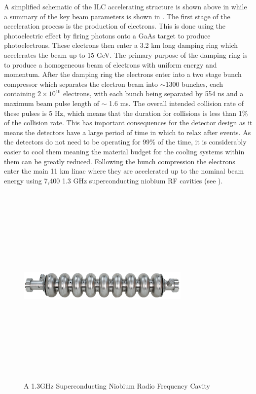A simplified schematic of the \ac{ILC} accelerating structure is shown above in  while a summary of the key beam parameters is shown in . The first stage of the acceleration process is the production of electrons. This is done using the photoelectric effect by firing photons onto a GaAs target to produce photoelectrons. These electrons then enter a 3.2 km long damping ring which accelerates the beam up to 15 GeV. The primary purpose of the damping ring is to produce a homogeneous beam of electrons with uniform energy and momentum. After the damping ring the electrons enter into a two stage bunch compressor which separates the electron beam into ${\sim}$1300 bunches, each containing ${2\times10^{10}}$ electrons, with each bunch being separated by 554 ns and a maximum beam pulse length of $\sim$ 1.6 ms. The overall intended collision rate of these pulses is 5 Hz, which means that the duration for collisions is less than 1\% of the collision rate. This has important consequences for the detector design as it means the detectors have a large period of time in which to relax after events. As the detectors do not need to be operating for 99\% of the time, it is considerably easier to cool them meaning the material budget for the cooling systems within them can be greatly reduced. Following the bunch compression the electrons enter the main 11 km linac where they are accelerated up to the nominal beam energy using 7,400 1.3 GHz superconducting niobium \ac{RF} cavities (see ). 

\begin{figure}
  \centering
  \includegraphics[width=0.75\textwidth,height=10cm,keepaspectratio]{Experiments/fig/Cavity}
  \caption[Superconducting Cavities For The ILC]{A 1.3GHz Superconducting Niobium Radio Frequency Cavity \cite{ILCTDR}}
  \label{Fig:cavity}
\end{figure}

